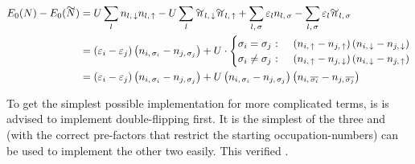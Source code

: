 \begin{equation}
    \label{eq:simplified-base-energy-hopping}
    \begin{split}
        E_0(N)-E_0(\vphantom{N}\smash{\tilde{N}}) 
        & = U\lsum n_{l,\,\down}n_{l,\,\up}-U\lsum \tilde{n}_{l,\,\down}\tilde{n}_{l,\,\up} 
        + \lsum[l,\,\sigma] \epsl n_{l,\,\sigma} - \lsum[l,\,\sigma] \epsl \tilde{n}_{l,\,\sigma}\\
        & =  \left(\epsl[i]-\epsl[j]\right)\left(n_{i,\,\sigma_i} - n_{j,\,\sigma_j}\right) +
        U\cdot \begin{cases}
            \sigma_i = \sigma_j\text{ : } & \left(n_{i,\,\up}-n_{j,\,\up}\right) \left(n_{i,\,\down}-n_{j,\,\down}\right)\\
            \sigma_i \neq \sigma_j\text{ : } & \left(n_{i,\,\up}-n_{j,\,\down}\right) \left(n_{i,\,\down}-n_{j,\,\up}\right)
        \end{cases}\\
        & = \left(\epsl[i]-\epsl[j]\right)\left(n_{i,\,\sigma_i} - n_{j,\,\sigma_j}\right) +
        U \left(n_{i,\,\sigma_i}-n_{j,\,\sigma_j}\right) \left(n_{i,\,\overline{\sigma_i}}-n_{j,\,\overline{\sigma_j}}\right)
    \end{split}
\end{equation}

To get the simplest possible implementation for more complicated terms, is is advised to implement double-flipping first.
It is the simplest of the three and (with the correct pre-factors that restrict the starting occupation-numbers) can be used to implement the other two easily.
This verified .